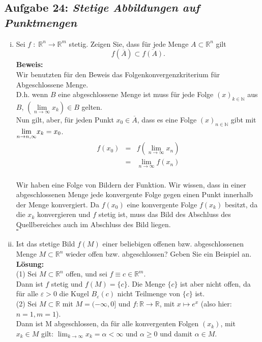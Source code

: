 \subsection*{Aufgabe 24: \mdseries\itshape Stetige Abbildungen auf Punktmengen}
\begin{enumerate}[(i)]
    \item Sei $f \; : \; \mathbb{R}^n \rightarrow \mathbb{R}^m$ stetig. Zeigen Sie, dass für jede
        Menge $ A \subset \mathbb{R}^n$ gilt
        $$
            f(\overline{A}) \subset \overline{f(A)}.
        $$
    \textbf{Beweis:}\\
        Wir benutzten für den Beweis das Folgenkonvergenzkriterium für Abgeschlossene Menge.\\
        D.h. wenn $B$ eine abgeschlossene Menge ist muss
        für jede Folge $(x)_{k\in \mathbb{N}}$ aus $B$,
        $\left( \underset{n \rightarrow \infty}{\lim} x_k \right) \in B$ gelten.\\

        Nun gilt, aber, für jeden Punkt $x_0 \in \overline{A}$, dass es eine Folge
        $(x)_{n \in \mathbb{N}}$ gibt mit $\underset{ n \rightarrow n,\infty}{\lim} x_k = x_0$.
        $$\begin{array}{rcl}
            f(x_0) &=& f(\underset{n \rightarrow \infty}{\lim} x_n)\\
                &=& \underset{n \rightarrow \infty}{\lim} f(x_n)\\
        \end{array}$$

        Wir haben eine Folge von Bildern der Funktion. Wir wissen, dass in einer abgeschlossenen
        Menge jede konvergente Folge gegen einen Punkt innerhalb der Menge konvergiert.
        Da $f(x_0)$ eine konvergente Folge $f(x_k)$ besitzt, da die $x_k$ konvergieren und $f$ stetig
        ist, muss das Bild des Abschluss des Quellbereiches  auch im Abschluss des Bild liegen.\\
        \mbox{} \hfill $\square$

    \item Ist das stetige Bild $f(M)$ einer beliebigen offenen bzw. abgeschlossenen Menge 
        $M \subset \mathbb{R}^n$ wieder offen bzw. abgeschlossen? Geben Sie ein Beispiel an.\\
    \textbf{Lösung:}\\
        (1) Sei $M \subset \mathbb{R}^n$ offen, und sei $f \equiv c \in \mathbb{R}^m$. \\
            Dann ist $f$ stetig und $f(M) = \{c\}$. Die Menge $\{c\}$ ist aber nicht offen, da für alle $\varepsilon > 0$ die Kugel $B_\varepsilon(c)$ nicht Teilmenge von $\{c\}$ ist.
\\
        (2) Sei $M \subset \mathbb{R}$ mit $M = (-\infty, 0]$ und $f: \mathbb{R} \to \mathbb{R}$, mit $x \mapsto e^x$ (also hier: $n = 1, m = 1$). \\
            Dann ist M abgeschlossen, da für alle konvergenten Folgen $(x_k)$, mit $x_k \in M$ gilt: $\lim_{k \to \infty} x_k = \alpha < \infty$ und $\alpha \geq 0$ und damit $\alpha \in M$.


\end{enumerate}
